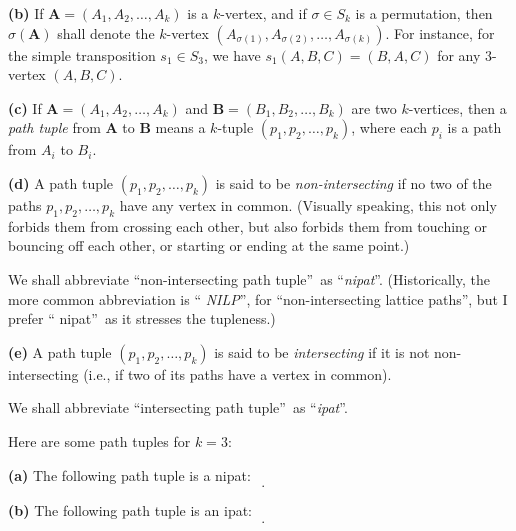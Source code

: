 \begin{definition}
\begin{definition}
\textbf{(b)} If $\mathbf{A}=\left(  A_{1},A_{2},\ldots,A_{k}\right)  $ is a
$k$-vertex, and if $\sigma\in S_{k}$ is a permutation, then $\sigma\left(
\mathbf{A}\right)  $ shall denote the $k$-vertex $\left(  A_{\sigma\left(
1\right)  },A_{\sigma\left(  2\right)  },\ldots,A_{\sigma\left(  k\right)
}\right)  $. For instance, for the simple transposition $s_{1}\in S_{3}$, we
have $s_{1}\left(  A,B,C\right)  =\left(  B,A,C\right)  $ for any $3$-vertex
$\left(  A,B,C\right)  $. \medskip

\textbf{(c)} If $\mathbf{A}=\left(  A_{1},A_{2},\ldots,A_{k}\right)  $ and
$\mathbf{B}=\left(  B_{1},B_{2},\ldots,B_{k}\right)  $ are two $k$-vertices,
then a \emph{path tuple} from $\mathbf{A}$ to $\mathbf{B}$ means a $k$-tuple
$\left(  p_{1},p_{2},\ldots,p_{k}\right)  $, where each $p_{i}$ is a path from
$A_{i}$ to $B_{i}$. \medskip

\textbf{(d)} A path tuple $\left(  p_{1},p_{2},\ldots,p_{k}\right)  $ is said
to be \emph{non-intersecting} if no two of the paths $p_{1},p_{2},\ldots
,p_{k}$ have any vertex in common. (Visually speaking, this not only forbids
them from crossing each other, but also forbids them from touching or bouncing
off each other, or starting or ending at the same point.)

We shall abbreviate \textquotedblleft non-intersecting path
tuple\textquotedblright\ as \textquotedblleft\emph{nipat}\textquotedblright.
(Historically, the more common abbreviation is \textquotedblleft%
\emph{NILP}\textquotedblright, for \textquotedblleft non-intersecting lattice
paths\textquotedblright, but I prefer \textquotedblleft
nipat\textquotedblright\ as it stresses the tupleness.) \medskip

\textbf{(e)} A path tuple $\left(  p_{1},p_{2},\ldots,p_{k}\right)  $ is said
to be \emph{intersecting} if it is not non-intersecting (i.e., if two of its
paths have a vertex in common).

We shall abbreviate \textquotedblleft intersecting path
tuple\textquotedblright\ as \textquotedblleft\emph{ipat}\textquotedblright.
\end{definition}

\begin{example}
Here are some path tuples for $k=3$: \medskip

\textbf{(a)} The following path tuple is a nipat:%
\[%
\ \ .
\]


\textbf{(b)} The following path tuple is an ipat:%
\[%
\ \ .
\]



\end{example}
\end{definition}

